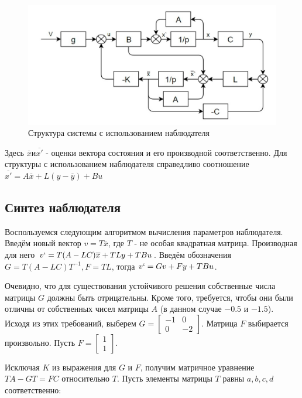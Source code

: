 \begin{figure}[h!]
	\centering
	\includegraphics[scale = 0.37]{images/2.png}
	\caption{Структура системы с использованием наблюдателя}
	\label{image:3}
\end{figure}
\FloatBarrier
Здесь $\overline{x} и \overline{x'}$ - оценки вектора состояния и его производной соответственно. Для структуры с использованием наблюдателя справедливо соотношение $\overline{x'}=A\overline{x}+L(y-\overline{y})+Bu$

\newpage
\subsection{Синтез наблюдателя}

Воспользуемся следующим алгоритмом вычисления параметров наблюдателя. Введём новый вектор $v=T\overline{x}$, где $T$ - не особая квадратная матрица. Производная для него $v`=T(A-LC)\overline{x}+TLy+TBu$. Введём обозначения $G=T(A-LC)T^{-1}, F=TL$, тогда $v`=Gv+Fy+TBu$.

Очевидно, что для существования устойчивого решения собственные числа матрицы $G$ должны быть отрицательны. Кроме того, требуется, чтобы они были отличны от собственных чисел матрицы $A$ (в данном случае $-0.5$ и $-1.5$). Исходя из этих требований, выберем $G=\begin{bmatrix} -1 & 0 \\ 0 & -2 \end{bmatrix}$. Матрица $F$ выбирается произвольно. Пусть $F=\begin{bmatrix} 1 \\ 1 \end{bmatrix}$.


Исключая $K$ из выражения для $G$ и $F$, получим матричное уравнение $TA-GT=FC$ относительно $T$. Пусть элементы матрицы $T$ равны $a,b,c,d$ соответственно:


